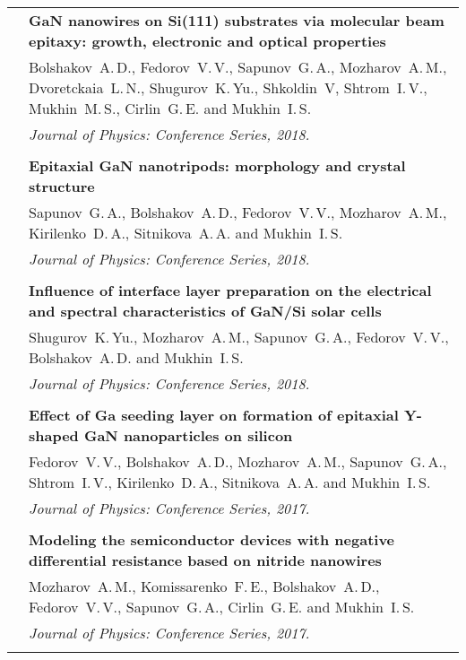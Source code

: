 \documentclass[letterpaper, 11pt]{article}
\begin{document}
\begin{longtable}{p{1.3in}p{4.8in}}
        & \textbf{GaN nanowires on Si(111) substrates via molecular beam
        epitaxy: growth, electronic and optical properties} \\
        & Bolshakov~A.\,D., Fedorov~V.\,V., Sapunov~G.\,A., Mozharov~A.\,M.,
        Dvoretckaia~L.\,N., Shugurov~K.\,Yu., Shkoldin~V, Shtrom~I.\,V.,
        Mukhin~M.\,S., Cirlin~G.\,E. and Mukhin~I.\,S. \\
		& \textit{Journal of Physics: Conference Series, 2018.}\\
		& \\
		
        & \textbf{Epitaxial GaN nanotripods: morphology and crystal structure}
        \\
        & Sapunov~G.\,A., Bolshakov~A.\,D., Fedorov~V.\,V.,  Mozharov~A.\,M.,
        Kirilenko~D.\,A., Sitnikova~A.\,A. and Mukhin~I.\,S. \\
		& \textit{Journal of Physics: Conference Series, 2018.}\\
		& \\
		
        & \textbf{Influence of interface layer preparation on the electrical
        and spectral characteristics of GaN/Si solar cells} \\
        & Shugurov~K.\,Yu., Mozharov~A.\,M., Sapunov~G.\,A., Fedorov~V.\,V.,
        Bolshakov~A.\,D. and Mukhin~I.\,S. \\
		& \textit{Journal of Physics: Conference Series, 2018.}\\
		& \\
		
        & \textbf{Effect of Ga seeding layer on formation of epitaxial Y-shaped
        GaN nanoparticles on silicon} \\
        & Fedorov~V.\,V., Bolshakov~A.\,D., Mozharov~A.\,M., Sapunov~G.\,A.,
        Shtrom~I.\,V., Kirilenko~D.\,A., Sitnikova~A.\,A. and Mukhin~I.\,S. \\
        & \textit{Journal of Physics: Conference Series, 2017.}\\
		& \\

        & \textbf{Modeling the semiconductor devices with negative differential
        resistance based on nitride nanowires} \\
        & Mozharov~A.\,M., Komissarenko~F.\,E., Bolshakov~A.\,D.,
        Fedorov~V.\,V., Sapunov~G.\,A., Cirlin~G.\,E. and Mukhin~I.\,S. \\
		& \textit{Journal of Physics: Conference Series, 2017.}\\
		& \\


\end{longtable}
\end{document}
